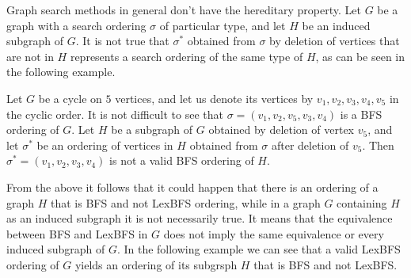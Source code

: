 \documentclass{svproc}
\begin{document}
Graph search methods in general don't have the hereditary property. Let $G$ be a graph with a search ordering $\sigma$ of particular type, and let $H$ be an induced subgraph of $G$. It is not true that $\sigma^*$ obtained from $\sigma$ by deletion of vertices that are not in $H$ represents a search ordering of the same type of $H$, as can be seen in the following example. 

\begin{example}
Let $G$ be a cycle on $5$ vertices, and let us denote its vertices by $v_1,v_2,v_3,v_4,v_5$ in the cyclic order. It is not difficult to see that $\sigma=(v_1,v_2,v_5,v_3,v_4)$ is a BFS ordering of $G$. Let $H$ be a subgraph of $G$ obtained by deletion of vertex $v_5$, and let $\sigma^*$ be an ordering of vertices in $H$ obtained from $\sigma$ after deletion of $v_5$. Then $\sigma^*=(v_1,v_2,v_3,v_4)$ is not a valid BFS ordering of $H$. 
\end{example}

From the above it follows that it could happen that there is an ordering of a graph $H$ that is BFS and not LexBFS ordering, while in a graph $G$ containing $H$ as an induced subgraph it is not necessarily true. It means that the equivalence between BFS and LexBFS in $G$ does not imply the same equivalence or every induced subgraph of $G$. In the following example we can see that a valid LexBFS ordering of $G$ yields an ordering of its subgrsph $H$ that is BFS and not LexBFS. 
\end{document}
